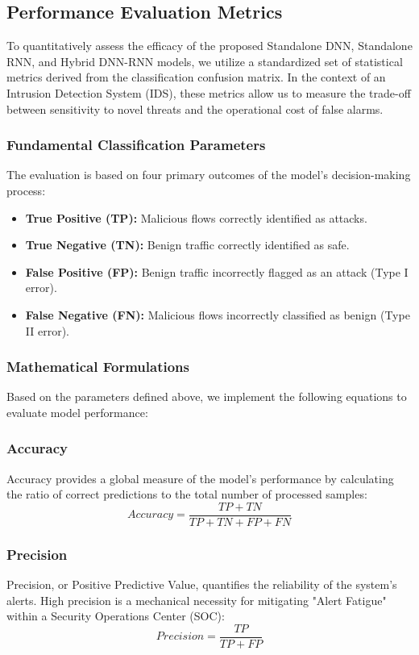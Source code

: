 \documentclass[10pt, conference, compsocconf, letterpaper, twocolumn, twoside]{IEEEtran}
\begin{document}
\subsection{Performance Evaluation Metrics}
To quantitatively assess the efficacy of the proposed Standalone DNN, Standalone RNN, and Hybrid DNN-RNN models, we utilize a standardized set of statistical metrics derived from the classification confusion matrix. In the context of an Intrusion Detection System (IDS), these metrics allow us to measure the trade-off between sensitivity to novel threats and the operational cost of false alarms.

\subsubsection{Fundamental Classification Parameters}
The evaluation is based on four primary outcomes of the model's decision-making process:
\begin{itemize}
    \item \textbf{True Positive (TP):} Malicious flows correctly identified as attacks.
    \item \textbf{True Negative (TN):} Benign traffic correctly identified as safe.
    \item \textbf{False Positive (FP):} Benign traffic incorrectly flagged as an attack (Type I error).
    \item \textbf{False Negative (FN):} Malicious flows incorrectly classified as benign (Type II error).
\end{itemize}

\subsubsection{Mathematical Formulations}
Based on the parameters defined above, we implement the following equations to evaluate model performance:

\subsubsection{Accuracy}
Accuracy provides a global measure of the model's performance by calculating the ratio of correct predictions to the total number of processed samples:
\begin{equation}
Accuracy = \frac{TP + TN}{TP + TN + FP + FN}
\end{equation}

\subsubsection{Precision}
Precision, or Positive Predictive Value, quantifies the reliability of the system's alerts. High precision is a mechanical necessity for mitigating "Alert Fatigue" within a Security Operations Center (SOC):
\begin{equation}
Precision = \frac{TP}{TP + FP}
\end{equation}
\end{document}
